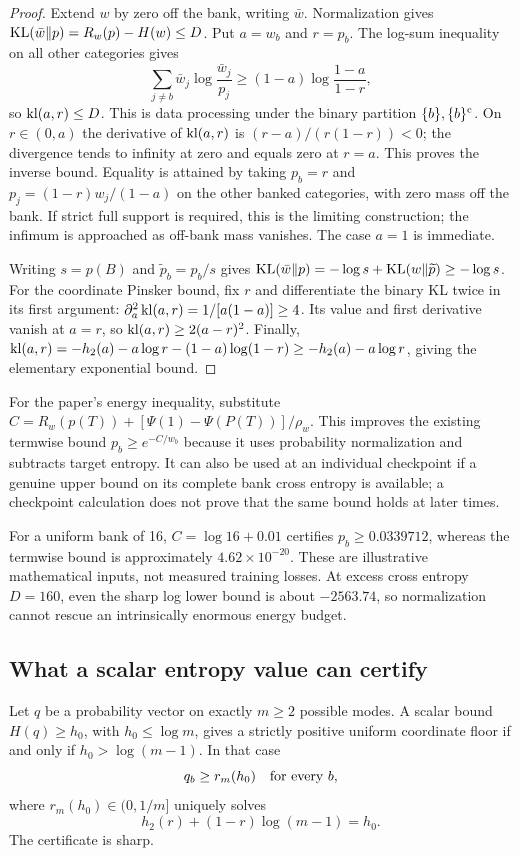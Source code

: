\begin{proof}
Extend $w$ by zero off the bank, writing $\bar w$. Normalization gives
$\operatorname{KL}(\bar w\|p)=R_w(p)-H(w)\le D$.
Put $a=w_b$ and $r=p_b$. The log-sum inequality on all other categories gives
\[
 \sum_{j\ne b}\bar w_j\log\frac{\bar w_j}{p_j}
 \ge(1-a)\log\frac{1-a}{1-r},
\]
so $\operatorname{kl}(a,r)\le D$. This is data processing under the binary partition
$\{b\},\{b\}^{\rm c}$. On $r\in(0,a)$ the derivative of $\operatorname{kl}(a,r)$ is
$(r-a)/(r(1-r))<0$; the divergence tends to infinity at zero and equals zero
at $r=a$. This proves the inverse bound. Equality is attained by taking
$p_b=r$ and $p_j=(1-r)w_j/(1-a)$ on the other banked categories, with zero
mass off the bank. If strict full support is required, this is the limiting
construction; the infimum is approached as off-bank mass vanishes. The case
$a=1$ is immediate.

Writing $s=p(B)$ and $\widetilde p_b=p_b/s$ gives
$\operatorname{KL}(\bar w\|p)=-\log s+\operatorname{KL}(w\|\widetilde p)\ge-\log s$.
For the coordinate Pinsker bound, fix $r$ and differentiate the binary
KL twice in its first argument: $\partial_a^2\operatorname{kl}(a,r)=1/[a(1-a)]\ge4$.
Its value and first derivative vanish at $a=r$, so
$\operatorname{kl}(a,r)\ge2(a-r)^2$. Finally,
$\operatorname{kl}(a,r)=-h_2(a)-a\log r-(1-a)\log(1-r)
\ge-h_2(a)-a\log r$, giving the elementary exponential bound.
\end{proof}

For the paper's energy inequality, substitute
$C=R_w(p(T))+[\Psi(1)-\Psi(P(T))]/\rho_w$.
This improves the existing termwise bound $p_b\ge e^{-C/w_b}$ because it
uses probability normalization and subtracts target entropy. It can also be
used at an individual checkpoint if a genuine upper bound on its complete
bank cross entropy is available; a checkpoint calculation does not prove
that the same bound holds at later times.

For a uniform bank of 16, $C=\log16+0.01$ certifies
$p_b\ge0.0339712$, whereas the termwise bound is approximately
$4.62\times10^{-20}$. These are illustrative mathematical inputs, not
measured training losses. At excess cross entropy $D=160$, even the sharp
log lower bound is about $-2563.74$, so normalization cannot rescue an
intrinsically enormous energy budget.

\subsection{What a scalar entropy value can certify}
\begin{proposition}
Let $q$ be a probability vector on exactly $m\ge2$ possible modes. A scalar
bound $H(q)\ge h_0$, with $h_0\le\log m$, gives a strictly positive uniform
coordinate floor if and only if $h_0>\log(m-1)$. In that case
\[
 q_b\ge r_m(h_0)\quad\hbox{for every }b,
\]
where $r_m(h_0)\in(0,1/m]$ uniquely solves
\[
 h_2(r)+(1-r)\log(m-1)=h_0.
\]
The certificate is sharp.
\end{proposition}


